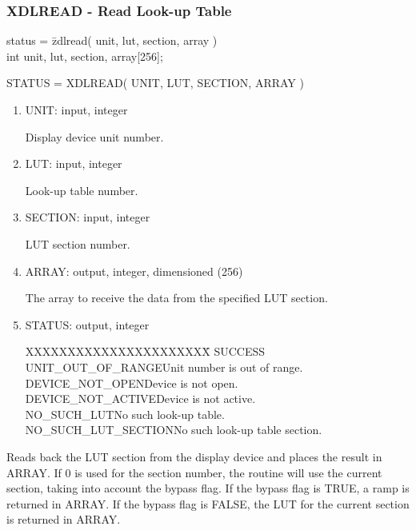 \subsubsection{XDLREAD - Read Look-up Table}
\begin{tabbing}
status = \=zdlread( unit, lut, section, array )\\
\>int  unit, lut, section, array[256];\\
\end{tabbing}
STATUS = XDLREAD( UNIT, LUT, SECTION, ARRAY )
\begin{enumerate}
\item UNIT:  input, integer

Display device unit number.
\item LUT:  input, integer

Look-up table number.
\item SECTION:  input, integer

LUT section number.
\item ARRAY:  output, integer, dimensioned (256)

The array to receive the data from the specified LUT section.
\item STATUS:  output, integer
\begin{tabbing}
XXXXXXXXXXXXXXXXXXXXXX\=\kill
SUCCESS\\
UNIT\_OUT\_OF\_RANGE\>Unit number is out of range.\\
DEVICE\_NOT\_OPEN\>Device is not open.\\
DEVICE\_NOT\_ACTIVE\>Device is not active.\\
NO\_SUCH\_LUT\>No such look-up table.\\
NO\_SUCH\_LUT\_SECTION\>No such look-up table section.\\
\end{tabbing}
\end{enumerate}
Reads back the LUT section from the display device and places the
result in ARRAY.  If 0 is used for the section number, the routine
will use the current section, taking into account the bypass flag.
If the bypass flag is TRUE, a ramp is returned in ARRAY.  If the
bypass flag is FALSE, the LUT for the current section is returned
in ARRAY.
\newpage
